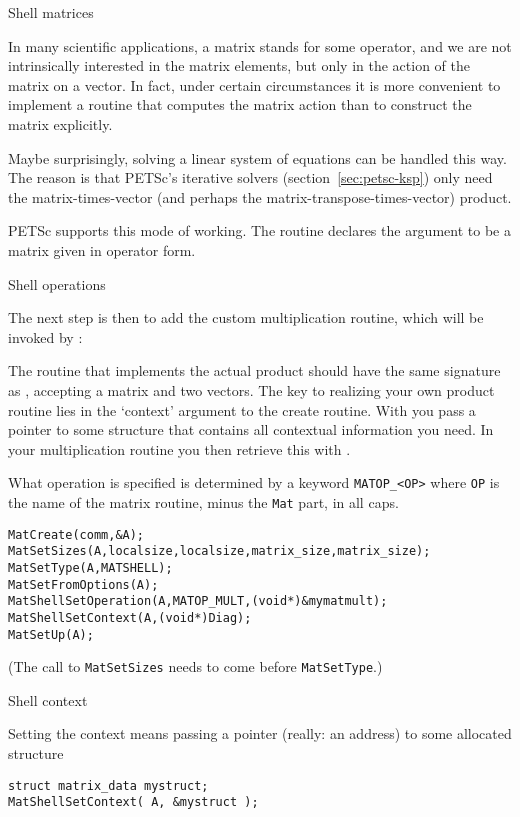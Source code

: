  {Shell matrices}
\label{sec:mat-shell}

In many scientific applications, a matrix stands for some operator,
and we are not intrinsically interested in the matrix elements, but
only in the action of the matrix on a vector. In fact, under certain
circumstances it is more convenient to implement a routine that
computes the matrix action than to construct the matrix explicitly.

Maybe surprisingly, solving a linear system of equations can be
handled this way. The reason is that PETSc's iterative solvers
(section~\ref{sec:petsc-ksp}) only need the matrix-times-vector (and perhaps
the matrix-transpose-times-vector) product.

PETSc supports this mode of working. The routine 
declares the argument to be a matrix given in operator form.

 {Shell operations}

The next step is then to add the custom multiplication routine, which
will be invoked by :
%

The routine that implements the actual product should have the same
signature as , accepting a matrix and two
vectors. The key to realizing your own product routine lies in the
`context' argument to the create routine. With
 you pass a pointer to some
structure that contains all contextual information you need. In your
multiplication routine you then retrieve this with .

What operation is specified is determined by a keyword \lstinline+MATOP_<OP>+
where \lstinline{OP} is the name of the matrix routine, minus the \lstinline{Mat} part,
in all caps.

\begin{lstlisting}
MatCreate(comm,&A);
MatSetSizes(A,localsize,localsize,matrix_size,matrix_size);
MatSetType(A,MATSHELL);
MatSetFromOptions(A);
MatShellSetOperation(A,MATOP_MULT,(void*)&mymatmult);
MatShellSetContext(A,(void*)Diag);
MatSetUp(A);
\end{lstlisting}
(The call to \lstinline{MatSetSizes} needs to come before \lstinline{MatSetType}.)

 {Shell context}

Setting the context means passing a pointer (really: an address) to
some allocated structure
\begin{lstlisting}
struct matrix_data mystruct;
MatShellSetContext( A, &mystruct );
\end{lstlisting}

